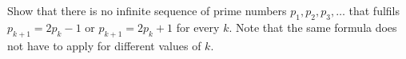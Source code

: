 Show that there is no infinite sequence of prime numbers $p_1,p_2,p_3,\dots$ that fulfils
$p_{k+1}=2p_k-1$ or $p_{k+1}=2p_k+1$ for every $k$.
Note that the same formula does not have to apply for different values of $k$.
